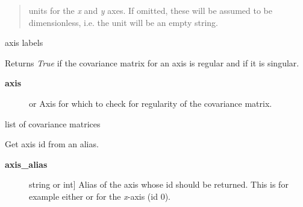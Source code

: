 \documentclass[a4paper,10pt,english]{sphinxmanual}
\begin{document}
\begin{fulllineitems}
\begin{quote}
units for the \emph{x} and \emph{y} axes. If omitted, these will be assumed to be
dimensionless, i.e. the unit will be an empty string.
\end{quote}

\begin{fulllineitems}
\label{index:kafe.dataset.Dataset.axis_labels}
axis labels

\end{fulllineitems}


\begin{fulllineitems}
\label{index:kafe.dataset.Dataset.cov_mat_is_regular}
Returns \emph{True} if the covariance matrix for an axis is regular and
 if it is singular.
\begin{description}
\item[{\textbf{axis}}] \leavevmode{[} or \code{'y'}{]}
Axis for which to check for regularity of the covariance matrix.

\end{description}

\end{fulllineitems}


\begin{fulllineitems}
\label{index:kafe.dataset.Dataset.cov_mats}
list of covariance matrices

\end{fulllineitems}


\begin{fulllineitems}
\label{index:kafe.dataset.Dataset.get_axis}
Get axis id from an alias.
\begin{description}
\item[{\textbf{axis\_alias}}] \leavevmode{[}string or int{]}
Alias of the axis whose id should be returned. This is for example
either  or  for the \emph{x}-axis (id 0).

\end{description}

\end{fulllineitems}


\end{fulllineitems}
\end{document}
